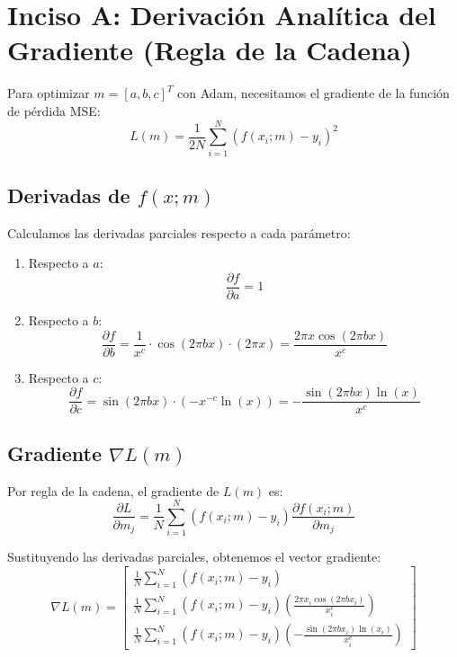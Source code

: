 \section{Inciso A: Derivación Analítica del Gradiente (Regla de la Cadena)}

Para optimizar $m=[a,b,c]^{T}$ con Adam, necesitamos el gradiente de la función de pérdida MSE:
\begin{equation}
    L(m)=\frac{1}{2N}\sum_{i=1}^{N}(f(x_{i};m)-y_{i})^{2}
\end{equation}

\subsection{Derivadas de \texorpdfstring{$f(x;m)$}{f(x;m)}}

Calculamos las derivadas parciales respecto a cada parámetro:

\begin{enumerate}
    \item Respecto a $a$:
    \begin{equation}
        \frac{\partial f}{\partial a} = 1
    \end{equation}

    \item Respecto a $b$:
    \begin{equation}
        \frac{\partial f}{\partial b} = \frac{1}{x^{c}} \cdot \cos(2\pi bx) \cdot (2\pi x) = \frac{2\pi x \cos(2\pi bx)}{x^{c}}
    \end{equation}

    \item Respecto a $c$:
    \begin{equation}
        \frac{\partial f}{\partial c} = \sin(2\pi bx) \cdot \left( -x^{-c} \ln(x) \right) = -\frac{\sin(2\pi bx) \ln(x)}{x^{c}}
    \end{equation}
\end{enumerate}

\subsection{Gradiente \texorpdfstring{$\nabla L(m)$}{grad L(m)}}

Por regla de la cadena, el gradiente de $L(m)$ es:
\begin{equation}
    \frac{\partial L}{\partial m_{j}} = \frac{1}{N} \sum_{i=1}^{N} (f(x_{i};m) - y_{i}) \frac{\partial f(x_{i};m)}{\partial m_{j}}
\end{equation}

Sustituyendo las derivadas parciales, obtenemos el vector gradiente:
\begin{equation}
    \nabla L(m) = \begin{bmatrix}
        \frac{1}{N} \sum_{i=1}^{N} (f(x_{i};m) - y_{i}) \\
        \frac{1}{N} \sum_{i=1}^{N} (f(x_{i};m) - y_{i}) \left( \frac{2\pi x_{i} \cos(2\pi bx_{i})}{x_{i}^{c}} \right) \\
        \frac{1}{N} \sum_{i=1}^{N} (f(x_{i};m) - y_{i}) \left( -\frac{\sin(2\pi bx_{i}) \ln(x_{i})}{x_{i}^{c}} \right)
    \end{bmatrix}
\end{equation}

